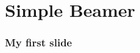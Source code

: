 \documentclass{beamer}
\begin{document}
\begin{frame}
    \titlepage
\end{frame}
\section{Simple Beamer}
\begin{frame}
    \frametitle{My first slide}
\end{frame}\

\end{document}
